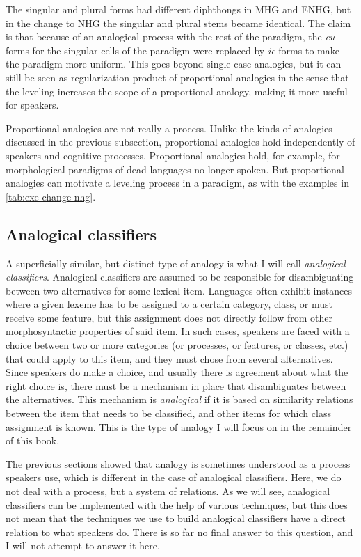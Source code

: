 The singular and plural forms had different diphthongs in MHG and ENHG, but in the change to NHG the singular and plural stems became identical. The claim is that because of an analogical process with the rest of the paradigm, the \textit{eu} forms for the singular cells of the paradigm were replaced by \textit{ie} forms to make the paradigm more uniform. This goes beyond single case analogies, but it can still be seen as regularization product of proportional analogies in the sense that the leveling increases the scope of a proportional analogy, making it more useful for speakers.

Proportional analogies are not really a process. Unlike the kinds of analogies discussed in the previous subsection, proportional analogies hold independently of speakers and cognitive processes. Proportional analogies hold, for example, for morphological paradigms of dead languages no longer spoken. But proportional analogies can motivate a leveling process in a paradigm, as with the examples in \ref{tab:exe-change-nhg}.


\subsection{Analogical classifiers}

A superficially similar, but distinct type of analogy is what I will call \textit{analogical classifiers}. Analogical classifiers are assumed to be responsible for disambiguating between two alternatives for some lexical item. Languages often exhibit instances where a given lexeme has to be assigned to a certain category, class, or must receive some feature, but this assignment does not directly follow from other morphosyntactic properties of said item. In such cases, speakers are faced with a choice between two or more categories (or processes, or features, or classes, etc.) that could apply to this item, and they must chose from several alternatives. Since speakers do make a choice, and usually there is agreement about what the right choice is, there must be a mechanism in place that disambiguates between the alternatives. This mechanism is \textit{analogical} if it is based on similarity relations between the item that needs to be classified, and other items for which class assignment is known. This is the type of analogy I will focus on in the remainder of this book.

The previous sections showed that analogy is sometimes understood as a process speakers use, which is different in the case of analogical classifiers. Here, we do not deal with a process, but a system of relations. As we will see, analogical classifiers can be implemented with the help of various techniques, but this does not mean that the techniques we use to build analogical classifiers have a direct relation to what speakers do. There is so far no final answer to this question, and I will not attempt to answer it here.


